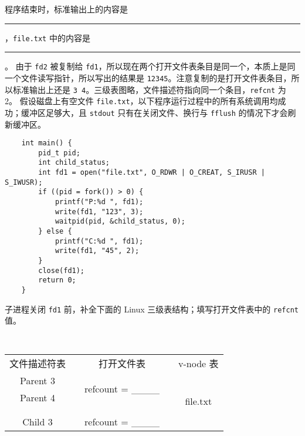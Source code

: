 \begin{problems}
\begin{table}[H]
\begin{tabular}{ccccc}
            \end{tabular}
        \end{table}
        \qn 程序结束时，标准输出上的内容是 \rule{3.5cm}{0.25mm}，\verb|file.txt| 中的内容是 \rule{3.5cm}{0.25mm}。
        \sol 由于 \verb|fd2| 被复制给 \verb|fd1|，所以现在两个打开文件表条目是同一个，本质上是同一个文件读写指针，所以写出的结果是 \verb|12345|。注意复制的是打开文件表条目，所以标准输出上还是 \verb|3 4|。三级表图略，文件描述符指向同一个条目，\verb|refcnt| 为 2。
        \pro 假设磁盘上有空文件 \verb|file.txt|，以下程序运行过程中的所有系统调用均成功；缓冲区足够大，且 \verb|stdout| 只有在关闭文件、换行与 \verb|fflush| 的情况下才会刷新缓冲区。
        \begin{verbatim}
    int main() {
        pid_t pid;
        int child_status;
        int fd1 = open("file.txt", O_RDWR | O_CREAT, S_IRUSR | S_IWUSR); 
        if ((pid = fork()) > 0) {
            printf("P:%d ", fd1);
            write(fd1, "123", 3);
            waitpid(pid, &child_status, 0);
        } else {
            printf("C:%d ", fd1);
            write(fd1, "45", 2);
        } 
        close(fd1);
        return 0;
    }
        \end{verbatim}
        \qn 子进程关闭 \verb|fd1| 前，补全下面的 Linux 三级表结构；填写打开文件表中的 \verb|refcnt| 值。
        \begin{table}[H]
            \tt
            \centering
            \begin{tabular}{ccccc}
                文件描述符表 & {\qquad \qquad \qquad} & 打开文件表 & {\qquad \qquad \qquad} & v-node 表 \\ \cline{1-1} \cline{3-3} \cline{5-5} 
                \multicolumn{1}{|c|}{Parent 3} & \multicolumn{1}{c|}{} & \multicolumn{1}{c|}{\multirow{2}{*}{refcount = \_\_\_\_}} & \multicolumn{1}{c|}{} & \multicolumn{1}{c|}{\multirow{6}{*}{file.txt}} \\ \cline{1-1}
                \multicolumn{1}{|c|}{Parent 4} & \multicolumn{1}{c|}{} & \multicolumn{1}{c|}{} & \multicolumn{1}{c|}{} & \multicolumn{1}{c|}{} \\ \cline{1-1} \cline{3-3}
                &  &  & \multicolumn{1}{c|}{} & \multicolumn{1}{c|}{} \\
                &  &  & \multicolumn{1}{c|}{} & \multicolumn{1}{c|}{} \\ \cline{1-1} \cline{3-3}
                \multicolumn{1}{|c|}{Child 3} & \multicolumn{1}{c|}{} & \multicolumn{1}{c|}{\multirow{2}{*}{refcount = \_\_\_\_}} & \multicolumn{1}{c|}{} & \multicolumn{1}{c|}{} \\ \cline{1-1}

\end{tabular}
\end{table}
\end{problems}
